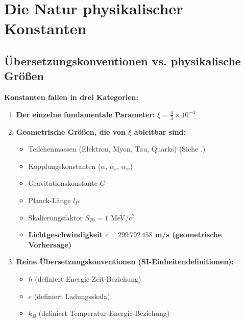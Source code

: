 	\section{Die Natur physikalischer Konstanten}
	
	\subsection{Übersetzungskonventionen vs. physikalische Größen}
	
	\begin{keyresult}
		\textbf{Konstanten fallen in drei Kategorien:}
		\begin{enumerate}
			\item \textbf{Der einzelne fundamentale Parameter:} $\xi = \frac{4}{3} \times 10^{-4}$
			
			\item \textbf{Geometrische Größen, die von $\xi$ ableitbar sind:}
			\begin{itemize}
				\item Teilchenmassen (Elektron, Myon, Tau, Quarks) (Siehe \cite{Teilchenmassen_De}.)
				\item Kopplungskonstanten ($\alpha$, $\alpha_s$, $\alpha_w$)
				\item Gravitationskonstante $G$
				\item Planck-Länge $l_P$
				\item Skalierungsfaktor $S_{T0} = 1$ MeV/$c^2$
				\item \textbf{Lichtgeschwindigkeit $c = 299\,792\,458$ m/s (geometrische Vorhersage)}
			\end{itemize}
			
			\item \textbf{Reine Übersetzungskonventionen (SI-Einheitendefinitionen):}
			\begin{itemize}
				\item $\hbar$ (definiert Energie-Zeit-Beziehung)
				\item $e$ (definiert Ladungsskala)
				\item $k_B$ (definiert Temperatur-Energie-Beziehung)
			\end{itemize}
		\end{enumerate}
	\end{keyresult}
	
